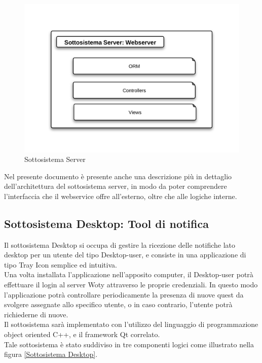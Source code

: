 \begin{figure}[H]
\centering
\includegraphics[scale=0.7]{images/cap2/Server/sottosistemaServer.png} %
\caption{Sottosistema Server}
\end{figure}

Nel presente documento è presente anche una descrizione più in dettaglio dell'architettura del sottosistema server, in modo da poter comprendere l'interfaccia che il webservice offre all'esterno, oltre che alle logiche interne.


\subsection{Sottosistema Desktop: Tool di notifica}

Il sottosistema Desktop si occupa di gestire la ricezione delle notifiche lato desktop per un utente del tipo Desktop-user, e consiste in una applicazione di tipo Tray Icon semplice ed intuitiva.\\
Una volta installata l'applicazione nell'apposito computer, il Desktop-user potrà effettuare il login al server Woty attraverso le proprie credenziali. In questo modo l'applicazione potrà controllare periodicamente la presenza di nuove quest da svolgere assegnate allo specifico utente, o in caso contrario, l'utente potrà richiederne di nuove.\\
Il sottosistema sarà implementato con l'utilizzo del linguaggio di programmazione object oriented C++, e il framework Qt correlato.\\
Tale sottosistema è stato suddiviso in tre componenti logici come illustrato nella figura \ref{Sottosistema Desktop}.


